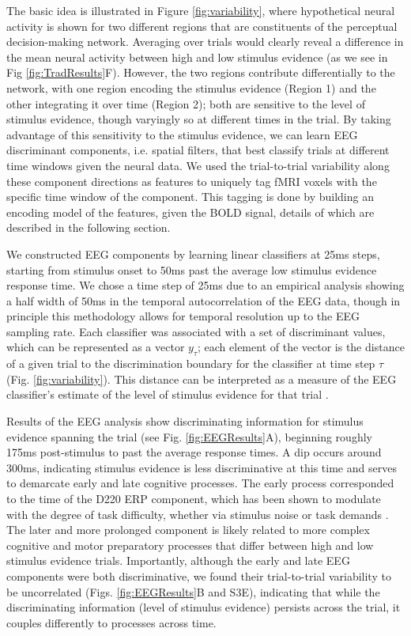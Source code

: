 The basic idea is illustrated in Figure \ref{fig:variability}, where hypothetical neural activity is shown for two different regions that are constituents of the perceptual decision-making network. Averaging over trials would clearly reveal a difference in the mean neural activity between high and low stimulus evidence (as we see in Fig \ref{fig:TradResults}F). However, the two regions contribute differentially to the network, with one region encoding the stimulus evidence (Region 1) and the other integrating it over time (Region 2); both are sensitive to the level of stimulus evidence, though varyingly so at different times in the trial.  By taking advantage of this sensitivity to the stimulus evidence, we can learn EEG discriminant components, i.e. spatial filters, that best classify trials at different time windows given the neural data.  We used the trial-to-trial variability along these component directions as features to uniquely tag fMRI voxels with the specific time window of the component. This tagging is done by building an encoding model of the features, given the BOLD signal, details of which are described in the following section.

We constructed EEG components by learning linear classifiers at 25ms steps, starting from stimulus onset to 50ms past the average low stimulus evidence response time. We chose a time step of 25ms due to an empirical analysis showing a half width of 50ms in the temporal autocorrelation of the EEG data, though in principle this methodology allows for temporal resolution up to the EEG sampling rate. Each classifier was associated with a set of discriminant values, which can be represented as a vector $y_{\tau}$; each element of the vector is the distance of a given trial to the discrimination boundary for the classifier at time step $\tau$ (Fig. \ref{fig:variability}). This distance can be interpreted as a measure of the EEG classifier's estimate of the level of stimulus evidence for that trial \cite{Goldman2009,Muraskin2015,Parra2005,Sajda2009,Sherwin2012,Walz2013}.

Results of the EEG analysis show discriminating information for stimulus evidence spanning the trial (see Fig. \ref{fig:EEGResults}A), beginning roughly 175ms post-stimulus to past the average response times.  A dip occurs around 300ms, indicating stimulus evidence is less discriminative at this time and serves to demarcate early and late cognitive processes. The early process corresponded to the time of the D220 ERP component, which has been shown to modulate with the degree of task difficulty, whether via stimulus noise or task demands \cite{Philiastides2006}. The later and more prolonged component is likely related to more complex cognitive and motor preparatory processes that differ between high and low stimulus evidence trials.  Importantly, although the early and late EEG components were both discriminative, we found their trial-to-trial variability to be uncorrelated (Figs. \ref{fig:EEGResults}B and S3E), indicating that while the discriminating information (level of stimulus evidence) persists across the trial, it couples differently to processes across time. 

